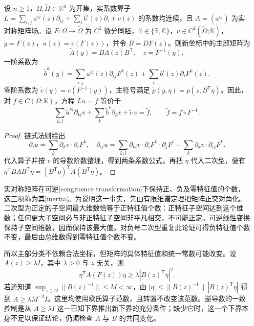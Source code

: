 \begin{proposition}\label{b2:prop:08-coordinate-change}
设 \(n\geq1\)，\(\Omega,\widetilde\Omega\subset\mathbb R^n\) 为开集，实系数算子 \(L=\sum_{i,j}a^{ij}(z)\partial_{ij}+\sum_i b^i(z)\partial_i+c(z)\) 的系数均连续，且 \(A=(a^{ij})\) 为实对称矩阵场。设 \(F:\Omega\to\widetilde\Omega\) 为 \(C^2\) 微分同胚，\(\mathbb K\in\{\mathbb R,\mathbb C\}\)，\(v\in C^2(\widetilde\Omega;\mathbb K)\)，\(y=F(z)\)，\(u(z)=v(F(z))\)，并令 \(B=DF(z)\)。则新坐标中的主部矩阵为
\begin{equation}\label{b2:eq:08-congruence}
 \widetilde A(y)=B A(z)B^{\mathsf T},\quad z=F^{-1}(y),
\end{equation}
一阶系数为
\begin{equation}\label{b2:eq:08-lower-transform}
 \widetilde b^k(y)=\sum_{i,j}a^{ij}(z)\partial_{ij}F^k(z)
 +\sum_i b^i(z)\partial_iF^k(z).
\end{equation}
零阶系数为 \(\widetilde c(y)=c(F^{-1}(y))\)，主符号满足 \(\widetilde p(y,\eta)=p(z,B^{\mathsf T}\eta)\)。因此，对 \(f\in C(\Omega;\mathbb K)\)，方程 \(Lu=f\) 等价于
\[
 \sum_{k,l}\widetilde a^{kl}\partial_{kl}v
 +\sum_k\widetilde b^k\partial_kv+\widetilde c\,v
 =\widetilde f,
 \qquad \widetilde f=f\circ F^{-1}.
\]
\end{proposition}
\begin{proof}
链式法则给出
\[
 \partial_i u=\sum_k\partial_kv\cdot\partial_iF^k,
\quad
 \partial_{ij}u=\sum_{k,l}\partial_{kl}v\cdot\partial_iF^k\cdot\partial_jF^l
 +\sum_k\partial_kv\cdot\partial_{ij}F^k.
\]
代入算子并按 \(v\) 的导数阶数整理，得到两条系数公式。再把 \(\eta\) 代入二次型，便有
\(\eta^{\mathsf T}BAB^{\mathsf T}\eta=(B^{\mathsf T}\eta)^{\mathsf T}A(B^{\mathsf T}\eta)\)。
\end{proof}

实对称矩阵在可逆[congruence transformation]下保持正、负及零特征值的个数，这三项称为其[inertia]。为说明这一事实，先由有限维谱定理把矩阵正交对角化。二次型为正定的子空间最大维数恰等于正特征值个数：正特征子空间达到这个维数；任何更大子空间必与非正特征子空间非平凡相交，不可能正定。可逆线性变换保持子空间维数，因而保持该最大值。对负号二次型重复此论证可得负特征值个数不变，最后由总维数得到零特征值个数不变。

\ProseParagraphBreak

所以主部分类不依赖合法坐标，但矩阵的具体特征值和统一常数可能改变。设 \(A(z)\geq\lambda I\)，其中 \(\lambda>0\) 与 \(z\) 无关，则
\[
 \eta^{\mathsf T}\widetilde A(F(z))\eta
 \geq\lambda|B(z)^{\mathsf T}\eta|^2.
\]
若还知道 \(\sup_{z\in\Omega}\|B(z)^{-1}\|\leq M<\infty\)，由
\( |\eta|\leq\|B(z)^{-1}\|\,|B(z)^{\mathsf T}\eta|\)
得到 \(\widetilde A\geq\lambda M^{-2}I\)。这里均使用欧氏算子范数，且转置不改变该范数。逆导数的一致控制是从 \(A\geq\lambda I\) 这一已知下界推出新下界的充分条件；缺少它时，这一个下界本身不足以保证结论，仍须检查 \(A\) 与 \(B\) 的共同变化。

